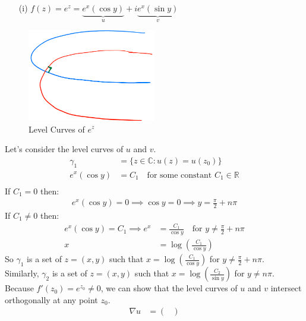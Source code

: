 \begin{example}
    \begin{itemize}
        \item[(i)] $f(z) = e^z = \underbrace{e^x(\cos y)}_u + i\underbrace{e^x(\sin y)}_{v}$
    \end{itemize}
    \begin{figure}[H]
        \centering
        \includegraphics[width=0.5\textwidth]{LECTURE_17/graph1.png}
        \caption{Level Curves of $e^z$}
    \end{figure}
    Let's consider the level curves of $u$ and $v$.
    \begin{align*}
        \gamma_1    & = \{z \in \mathbb{C} : u(z) = u(z_0)\}                   \\
        e^x(\cos y) & = C_1 \quad \text{for some constant } C_1 \in \mathbb{R} \\
    \end{align*}
    If $C_1 = 0$ then:
    \begin{align*}
        e^x(\cos y) = 0 \implies \cos y = 0 \implies y = \frac{\pi}{2} + n\pi
    \end{align*}
    If $C_1 \neq 0$ then:
    \begin{align*}
        e^x(\cos y) = C_1 \implies e^x & = \frac{C_1}{\cos y} \quad \text{for } y \neq \frac{\pi}{2} + n\pi \\
        x                              & = \log \left(\frac{C_1}{\cos y}\right)
    \end{align*}
    So $\gamma_1$ is a set of $z = (x, y)$ such that $x = \log \left(\frac{C_1}{\cos y}\right)$ for $y \neq \frac{\pi}{2} + n\pi$.\\
    Similarly, $\gamma_2$ is a set of $z = (x, y)$ such that $x = \log \left(\frac{C_2}{\sin y}\right)$ for $y \neq n\pi$.\\
    Because $f'(z_0) = e^{z_0} \neq 0$, we can show that the level curves of $u$ and $v$ intersect orthogonally at any point $z_0$.
    \begin{align*}
        \nabla u & = \begin{pmatrix}

\end{pmatrix}
\end{align*}
\end{example}
